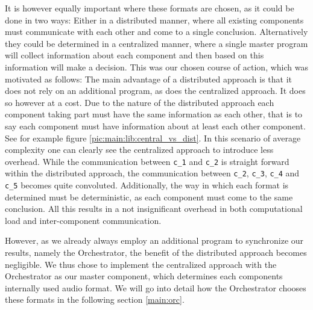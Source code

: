 \label{main:lib:format_chooosing}
It is however equally important where these formats are chosen, as it could be done in two ways:
Either in a distributed manner, where all existing components must communicate with each other and come to a single conclusion.
Alternatively they could be determined in a centralized manner, where a single master program will collect information about each component and then based on this information will make a decision.
This was our chosen course of action, which was motivated as follows:
The main advantage of a distributed approach is that it does not rely on an additional program, as does the centralized approach.
It does so however at a cost. 
Due to the nature of the distributed approach each component taking part must have the same information as each other, that is to say each component must have information about at least each other component.
See for example figure \ref{pic:main:lib:central_vs_dist}.
In this scenario of average complexity one can clearly see the centralized approach to introduce less overhead.
While the communication between \texttt{c\_1} and \texttt{c\_2} is straight forward within the distributed approach, the communication between \texttt{c\_2}, \texttt{c\_3}, \texttt{c\_4} and \texttt{c\_5} becomes quite convoluted.
Additionally, the way in which each format is determined must be deterministic, as each component must come to the same conclusion.
All this results in a not insignificant overhead in both computational load and inter-component communication.

However, as we already always employ an additional program to synchronize our results, namely the Orchestrator, the benefit of the distributed approach becomes negligible.
We thus chose to implement the centralized approach with the Orchestrator as our master component, which determines each components internally used audio format.
We will go into detail how the Orchestrator chooses these formats in the following section \ref{main:orc}.

